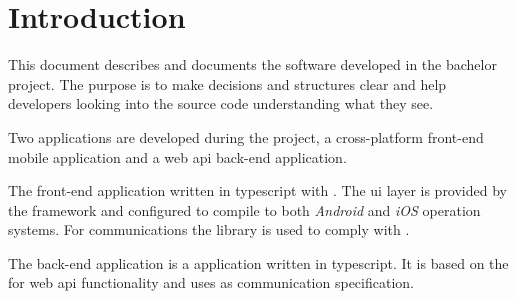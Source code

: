 \chapter{Introduction}
This document describes and documents the software developed in the bachelor project.
The purpose is to make decisions and structures clear and help developers looking into the source code understanding what they see.

Two applications are developed during the project, a cross-platform front-end mobile application and a web \gls{api} back-end application.

The front-end application written in \gls{typescript} with .
The \gls{ui} layer is provided by the  framework and configured to compile to both \textit{Android} and \textit{iOS} operation systems.
For communications the library  is used to comply with .

The back-end application is a  application written in \gls{typescript}.
It is based on the  for web \gls{api} functionality and uses  as communication specification.
